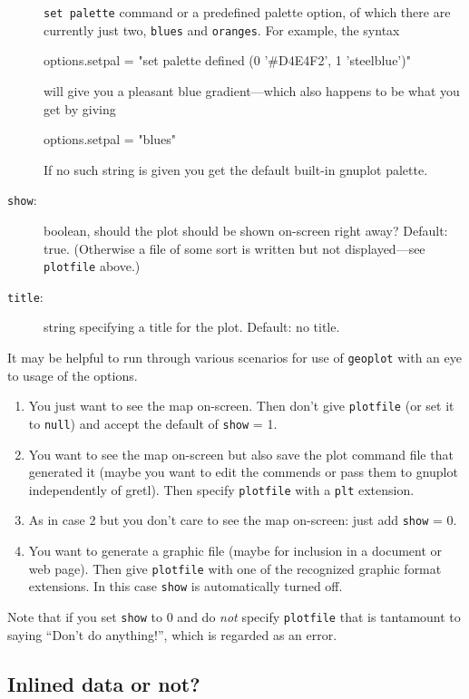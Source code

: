 \documentclass{article}
\begin{document}
\begin{description}
  \texttt{set palette} command or a predefined palette option, of
  which there are currently just two, \texttt{blues} and
  \texttt{oranges}. For example, the syntax
  \begin{code}
    options.setpal = "set palette defined (0 '#D4E4F2', 1 'steelblue')"
  \end{code}
  will give you a pleasant blue gradient---which also happens to be
  what you get by giving
  \begin{code}
    options.setpal = "blues"
  \end{code}
  If no such string is given you get the default built-in
  \textsf{gnuplot} palette.
\item[\texttt{show}:] boolean, should the plot should be shown
  on-screen right away? Default: true. (Otherwise a file of some sort
  is written but not displayed---see \texttt{plotfile} above.)
\item[\texttt{title}:] string specifying a title for the
  plot. Default: no title.
\end{description}

It may be helpful to run through various scenarios for use of
\texttt{geoplot} with an eye to usage of the options.

\begin{enumerate}
\item You just want to see the map on-screen. Then don't give
  \texttt{plotfile} (or set it to \texttt{null}) and accept the
  default of \texttt{show} = 1.\label{just-see}
\item You want to see the map on-screen but also save the plot command
  file that generated it (maybe you want to edit the commends or pass
  them to \textsf{gnuplot} independently of gretl). Then specify
  \texttt{plotfile} with a \texttt{plt} extension.\label{see-and-save}
\item As in case 2 but you don't care to see the map on-screen:
  just add \texttt{show} = 0.
\item You want to generate a graphic file (maybe for inclusion in a
  document or web page). Then give \texttt{plotfile} with one of the
  recognized graphic format extensions. In this case \texttt{show} is
  automatically turned off.
\end{enumerate}

Note that if you set \texttt{show} to 0 and do \textit{not} specify
\texttt{plotfile} that is tantamount to saying ``Don't do anything!'',
which is regarded as an error.

\subsection{Inlined data or not?}
\end{document}
